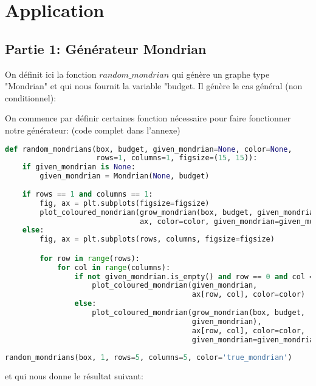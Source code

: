 \newpage

\section{Application}

\subsection{Partie 1: Générateur Mondrian}

On définit ici la fonction $random\_ mondrian$ qui génère un graphe type "Mondrian" et qui nous fournit la variable "budget.
Il génère le cas général (non conditionnel):

On commence par définir certaines fonction nécessaire pour faire fonctionner notre générateur: (code complet dans l'annexe)

\begin{lstlisting}[language=Python]
def random_mondrians(box, budget, given_mondrian=None, color=None, 
                     rows=1, columns=1, figsize=(15, 15)):
    if given_mondrian is None:
        given_mondrian = Mondrian(None, budget)
        
    if rows == 1 and columns == 1:
        fig, ax = plt.subplots(figsize=figsize)  
        plot_coloured_mondrian(grow_mondrian(box, budget, given_mondrian), 
                               ax, color=color, given_mondrian=given_mondrian)
    else:
        fig, ax = plt.subplots(rows, columns, figsize=figsize)  

        for row in range(rows):
            for col in range(columns):
                if not given_mondrian.is_empty() and row == 0 and col ==0:
                    plot_coloured_mondrian(given_mondrian, 
                                           ax[row, col], color=color)
                else:
                    plot_coloured_mondrian(grow_mondrian(box, budget, 
                                           given_mondrian), 
                                           ax[row, col], color=color, 
                                           given_mondrian=given_mondrian)
\end{lstlisting}

\begin{lstlisting}[language=Python]
random_mondrians(box, 1, rows=5, columns=5, color='true_mondrian')
\end{lstlisting}

et qui nous donne le résultat suivant:

